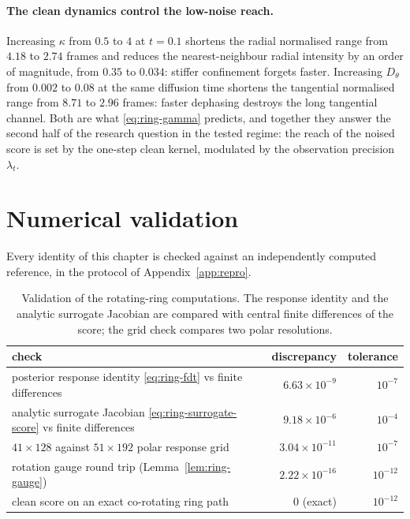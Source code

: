 \paragraph{The clean dynamics control the low-noise reach.} Increasing $\kappa$
from $0.5$ to $4$ at $t = 0.1$ shortens the radial normalised range from $4.18$
to $2.74$ frames and reduces the nearest-neighbour radial intensity by an order
of magnitude, from $0.35$ to $0.034$: stiffer confinement forgets faster.
Increasing $D_\theta$ from $0.002$ to $0.08$ at the same diffusion time
shortens the tangential normalised range from $8.71$ to $2.96$ frames: faster
dephasing destroys the long tangential channel. Both are what
\eqref{eq:ring-gamma} predicts, and together they answer the second half of the
research question in the tested regime: the reach of the noised score is set by
the one-step clean kernel, modulated by the observation precision $\lambda_t$.

\section{Numerical validation}\label{sec:ring-validation}

Every identity of this chapter is checked against an independently computed
reference, in the protocol of Appendix~\ref{app:repro}.

\begin{table}[t]\centering
\caption{Validation of the rotating-ring computations. The response identity
and the analytic surrogate Jacobian are compared with central finite
differences of the score; the grid check compares two polar resolutions.}
\label{tab:ring-validation}
\begin{tabular}{@{}lrr@{}}
\toprule
check & discrepancy & tolerance \\
\midrule
posterior response identity \eqref{eq:ring-fdt} vs finite differences
  & $6.63\times10^{-9}$ & $10^{-7}$ \\
analytic surrogate Jacobian \eqref{eq:ring-surrogate-score} vs finite differences
  & $9.18\times10^{-6}$ & $10^{-4}$ \\
$41\times128$ against $51\times192$ polar response grid
  & $3.04\times10^{-11}$ & $10^{-7}$ \\
rotation gauge round trip (Lemma~\ref{lem:ring-gauge})
  & $2.22\times10^{-16}$ & $10^{-12}$ \\
clean score on an exact co-rotating ring path
  & $0$ (exact) & $10^{-12}$ \\
\bottomrule
\end{tabular}
\end{table}

